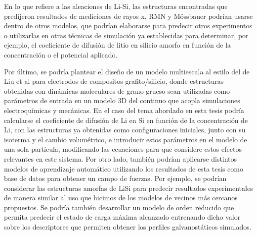 En lo que refiere a las aleaciones de Li-Si, las estructuras encontradas
que predijeron resultados de mediciones de rayos x, RMN y Mössbauer podrían 
usarse dentro de otros modelos, que podrían elaborarse para predecir otros 
experimentos o utilizarlas en otras técnicas de simulación ya establecidas para 
determinar, por ejemplo, el coeficiente de difusión de litio en silicio amorfo en 
función de la concentración o el potencial aplicado.

Por último, se podría plantear el diseño de un modelo multiescala al estilo del 
de Liu et al \cite{liu2021towards} para electrodos de compositos grafito/silicio,
donde estructuras obtenidas con dinámicas moleculares de grano grueso sean 
utilizadas como parámetros de entrada en un modelo 3D del continuo que acopla 
simulaciones electroquímicas y mecánicas. En el caso del tema abordado en esta tesis podría 
calcularse el coeficiente de difusión de Li en Si en función de la concentración 
de Li, con las estructuras ya obtenidas como configuraciones iniciales, junto con
su isoterma y el cambio volumétrico, e introducir estos parámetros en el modelo 
de una sola partícula, modificando las ecuaciones para que considere 
estos efectos relevantes en este sistema. Por otro lado, también podrían 
aplicarse distintos modelos de aprendizaje automático utilizando los resultados 
de esta tesis como base de datos para obtener un campo de fuerzas. Por ejemplo, se podrían considerar las estructuras amorfas 
de LiSi para predecir resultados experimentales de manera similar al uso que hicimos de los modelos de
vecinos más cercanos propuestos. Se podría también desarrollar un modelo de orden reducido que
permita predecir el estado de carga máxima alcanzado entrenando dicho valor sobre 
los descriptores que permiten obtener los perfiles galvanostáticos simulados.
